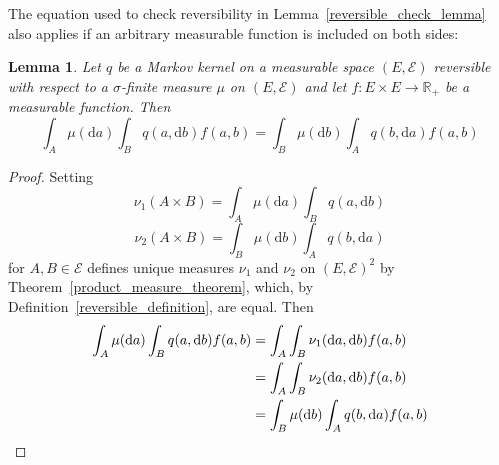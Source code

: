 \documentclass[english,twoside,openright]{HYgraduMLDS}
\newtheorem{lemma}{Lemma}[chapter]
\newcommand{\R}{\mathbb{R}}
\newcommand{\dx}{\mathrm{d}}
\begin{document}
The equation used to check reversibility in Lemma~\ref{reversible_check_lemma}
also applies if an arbitrary measurable function is included on both sides:
\begin{lemma}\label{reversible_integration_lemma}
  Let \(q\) be a Markov kernel on a measurable space \((E, \mathcal{E})\)
  reversible with respect to a \(\sigma\)-finite measure \(\mu\) on
  \((E, \mathcal{E})\) and let \(f\colon E\times E\to \R_{+}\) be a
  measurable function. Then
  \[
    \int_{A}\mu(\dx a)\int_{B}q(a, \dx b)f(a, b)
    = \int_{B}\mu(\dx b)\int_{A}q(b, \dx a)f(a, b)
  \]
\end{lemma}
\begin{proof}
  Setting
  \[
    \nu_{1}(A\times B) = \int_{A}\mu(\dx a)\int_{B}q(a, \dx b)
  \]
  \[
    \nu_{2}(A\times B) = \int_{B}\mu(\dx b)\int_{A}q(b, \dx a)
  \]
  for \(A, B\in \mathcal{E}\) defines unique measures
  \(\nu_{1}\) and \(\nu_{2}\) on
  \((E, \mathcal{E})^{2}\) by Theorem~\ref{product_measure_theorem}, which,
  by Definition~\ref{reversible_definition}, are equal. Then
  \begin{align*}
    \int_{A}\mu(\dx a)\int_{B}q(a, \dx b)f(a, b)
    &= \int_{A}\int_{B}\nu_{1}(\dx a, \dx b)f(a, b)
    \\&= \int_{A}\int_{B}\nu_{2}(\dx a, \dx b)f(a, b)
    \\&= \int_{B}\mu(\dx b)\int_{A}q(b, \dx a)f(a, b)
    \qedhere
  \end{align*}
\end{proof}
\end{document}
